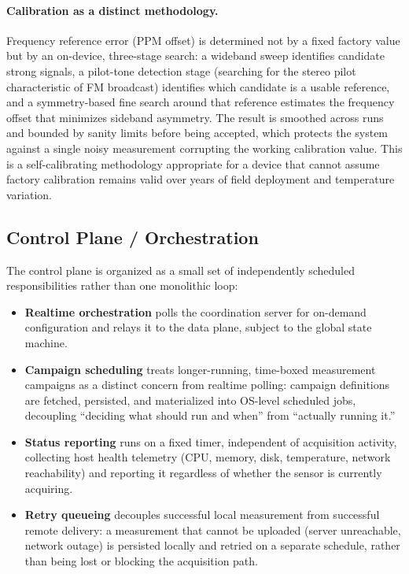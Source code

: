 \documentclass[11pt,a4paper]{article}
\begin{document}
\paragraph{Calibration as a distinct methodology.} Frequency reference error (PPM offset) is
determined not by a fixed factory value but by an on-device, three-stage search: a wideband
sweep identifies candidate strong signals, a pilot-tone detection stage (searching for the
stereo pilot characteristic of FM broadcast) identifies which candidate is a usable reference,
and a symmetry-based fine search around that reference estimates the frequency offset that
minimizes sideband asymmetry. The result is smoothed across runs and bounded by sanity limits
before being accepted, which protects the system against a single noisy measurement
corrupting the working calibration value. This is a self-calibrating methodology appropriate
for a device that cannot assume factory calibration remains valid over years of field
deployment and temperature variation.

\subsection{Control Plane / Orchestration}

The control plane is organized as a small set of independently scheduled responsibilities
rather than one monolithic loop:

\begin{itemize}[leftmargin=1.4em]
    \item \textbf{Realtime orchestration} polls the coordination server for on-demand
    configuration and relays it to the data plane, subject to the global state machine.
    \item \textbf{Campaign scheduling} treats longer-running, time-boxed measurement
    campaigns as a distinct concern from realtime polling: campaign definitions are
    fetched, persisted, and materialized into OS-level scheduled jobs, decoupling
    ``deciding what should run and when'' from ``actually running it.''
    \item \textbf{Status reporting} runs on a fixed timer, independent of acquisition
    activity, collecting host health telemetry (CPU, memory, disk, temperature, network
    reachability) and reporting it regardless of whether the sensor is currently acquiring.
    \item \textbf{Retry queueing} decouples successful local measurement from successful
    remote delivery: a measurement that cannot be uploaded (server unreachable, network
    outage) is persisted locally and retried on a separate schedule, rather than being lost
    or blocking the acquisition path.
\end{itemize}
\end{document}
